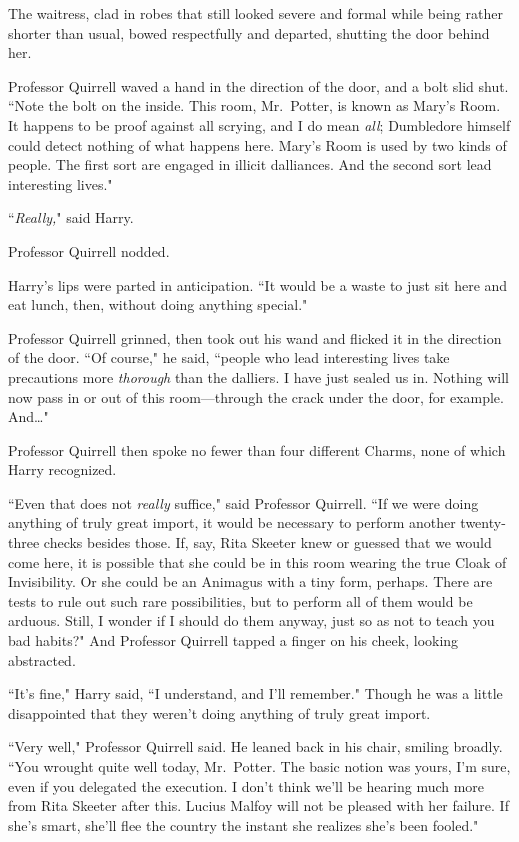 The waitress, clad in robes that still looked severe and formal while being rather shorter than usual, bowed respectfully and departed, shutting the door behind her.

Professor Quirrell waved a hand in the direction of the door, and a bolt slid shut. ``Note the bolt on the inside. This room, Mr.~Potter, is known as Mary's Room. It happens to be proof against all scrying, and I do mean \emph{all}; Dumbledore himself could detect nothing of what happens here. Mary's Room is used by two kinds of people. The first sort are engaged in illicit dalliances. And the second sort lead interesting lives."

``\emph{Really,}" said Harry.

Professor Quirrell nodded.

Harry's lips were parted in anticipation. ``It would be a waste to just sit here and eat lunch, then, without doing anything special."

Professor Quirrell grinned, then took out his wand and flicked it in the direction of the door. ``Of course," he said, ``people who lead interesting lives take precautions more \emph{thorough} than the dalliers. I have just sealed us in. Nothing will now pass in or out of this room—through the crack under the door, for example. And{\ldots}"

Professor Quirrell then spoke no fewer than four different Charms, none of which Harry recognized.

``Even that does not \emph{really} suffice," said Professor Quirrell. ``If we were doing anything of truly great import, it would be necessary to perform another twenty-three checks besides those. If, say, Rita Skeeter knew or guessed that we would come here, it is possible that she could be in this room wearing the true Cloak of Invisibility. Or she could be an Animagus with a tiny form, perhaps. There are tests to rule out such rare possibilities, but to perform all of them would be arduous. Still, I wonder if I should do them anyway, just so as not to teach you bad habits?" And Professor Quirrell tapped a finger on his cheek, looking abstracted.

``It's fine," Harry said, ``I understand, and I'll remember." Though he was a little disappointed that they weren't doing anything of truly great import.

``Very well," Professor Quirrell said. He leaned back in his chair, smiling broadly. ``You wrought quite well today, Mr.~Potter. The basic notion was yours, I'm sure, even if you delegated the execution. I don't think we'll be hearing much more from Rita Skeeter after this. Lucius Malfoy will not be pleased with her failure. If she's smart, she'll flee the country the instant she realizes she's been fooled."

